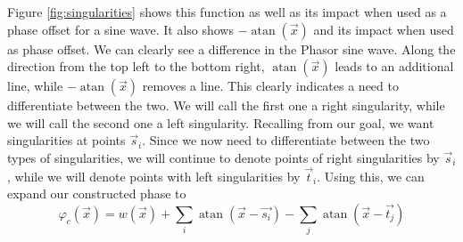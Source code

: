 \documentclass{utue} %
\DeclareMathOperator{\atan}{atan}
\begin{document}
Figure \ref{fig:singularities} shows this function as well as its impact when used as a phase offset for a sine wave.
It also shows $-\atan(\vec{x})$ and its impact when used as phase offset. We can clearly see a difference in the Phasor sine wave. Along the direction from the top left to the bottom right, $\atan(\vec{x})$ leads to an additional line, while $-\atan(\vec{x})$ removes a line. This clearly indicates a need to differentiate between the two. We will call the first one a right singularity, while we will call the second one a left singularity. Recalling from our goal, we want singularities at points $\vec{s}_i$. Since we now need to differentiate between the two types of singularities, we will continue to denote points of right singularities by $\vec{s}_i$, while we will denote points with left singularities by $\vec{t}_i$. Using this, we can expand our constructed phase to
$$
\varphi_c(\vec{x}) = w(\vec{x}) + \sum_i \atan(\vec{x}-\vec{s_i}) - \sum_j \atan(\vec{x}-\vec{t_j})
$$
\end{document}
